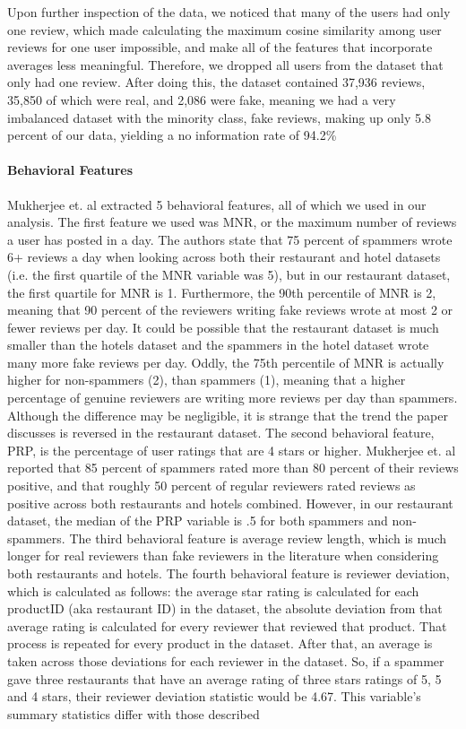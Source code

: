 Upon further inspection of the data, we noticed that many of the users had only one review, which made calculating the maximum cosine similarity among user reviews for one user impossible, and make all of the features that incorporate averages less meaningful. Therefore, we dropped all users from the dataset that only had one review. After doing this, the dataset contained 37,936 reviews, 35,850 of which were real, and 2,086 were fake, meaning we had a very imbalanced dataset with the minority class, fake reviews, making up only 5.8 percent of our data, yielding a no information rate of 94.2\%

\vspace{2mm}

\paragraph{Behavioral Features} Mukherjee et. al extracted 5 behavioral features, all of which we used in our analysis. The first feature we used was MNR, or the maximum number of reviews a user has posted in a day. The authors state that 75 percent of spammers wrote 6+ reviews a day when looking across both their restaurant and hotel datasets (i.e. the first quartile of the MNR variable was 5), but in our restaurant dataset, the first quartile for MNR is 1. Furthermore, the 90th percentile of MNR is 2, meaning that 90 percent of the reviewers writing fake reviews wrote at most 2 or fewer reviews per day. It could be possible that the restaurant dataset is much smaller than the hotels dataset and the spammers in the hotel dataset wrote many more fake reviews per day. Oddly, the 75th percentile of MNR is actually higher for non-spammers (2), than spammers (1), meaning that a higher percentage of genuine reviewers are writing more reviews per day than spammers. Although the difference may be negligible, it is strange that the trend the paper discusses is reversed in the restaurant dataset. The second behavioral feature, PRP, is the percentage of user ratings that are 4 stars or higher. Mukherjee et. al reported that 85 percent of spammers rated more than 80 percent of their reviews positive, and that roughly 50 percent of regular reviewers rated reviews as positive across both restaurants and hotels combined. However, in our restaurant dataset, the median of the PRP variable is .5 for both spammers and non-spammers. The third behavioral feature is average review length, which is much longer for real reviewers than fake reviewers in the literature when considering both restaurants and hotels. The fourth behavioral feature is reviewer deviation, which is calculated as follows: the average star rating is calculated for each productID (aka restaurant ID) in the dataset, the absolute deviation from that average rating is calculated for every reviewer that reviewed that product. That process is repeated for every product in the dataset. After that, an average is taken across those deviations for each reviewer in the dataset. So, if a spammer gave three restaurants that have an average rating of three stars ratings of 5, 5 and 4 stars, their reviewer deviation statistic would be 4.67. This variable's summary statistics differ with those described 